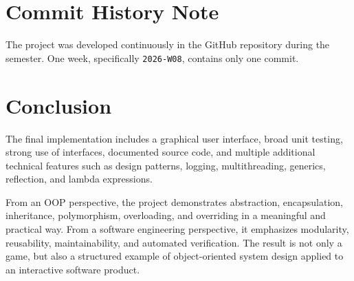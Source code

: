 \documentclass[12pt]{extarticle}
\begin{document}
\section{Commit History Note}
The project was developed continuously in the GitHub repository during the semester. One week, specifically \texttt{2026-W08}, contains only one commit.

\section{Conclusion}
The final implementation includes a graphical user interface, broad unit testing, strong use of interfaces, documented source code, and multiple additional technical features such as design patterns, logging, multithreading, generics, reflection, and lambda expressions.

From an OOP perspective, the project demonstrates abstraction, encapsulation, inheritance, polymorphism, overloading, and overriding in a meaningful and practical way. From a software engineering perspective, it emphasizes modularity, reusability, maintainability, and automated verification. The result is not only a game, but also a structured example of object-oriented system design applied to an interactive software product.
\end{document}
